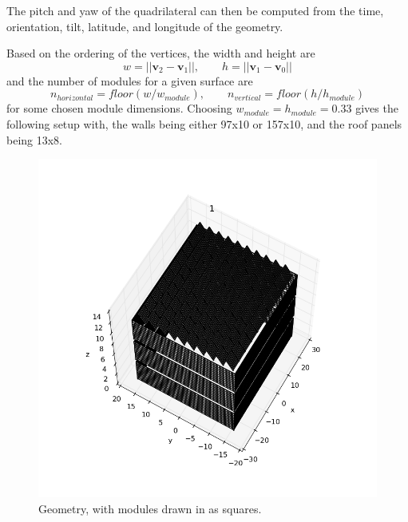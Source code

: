\documentclass[11pt]{article}
\begin{document}
The pitch and yaw of the quadrilateral can then be computed from the time, orientation, tilt, latitude, and longitude of the geometry.

Based on the ordering of the vertices, the width and height are 
\[ w = ||\mathbf{v}_2-\mathbf{v}_1||, \qquad h = ||\mathbf{v}_1-\mathbf{v}_0||
\]
and the number of modules for a given surface are 
\[
n_{horizontal} = floor(w/w_{module}), \qquad n_{vertical} = floor(h/h_{module})
\]
for some chosen module dimensions. Choosing $w_{module} = h_{module} = 0.33$ gives the following setup with, the walls being either 97x10 or 157x10, and the roof panels being 13x8.

\begin{figure}
\centering
\includegraphics[width=1.0\textwidth]{images/whole-building-all.png}
\caption{Geometry, with modules drawn in as squares.}
\label{fig:normals}
\end{figure}
\end{document}

